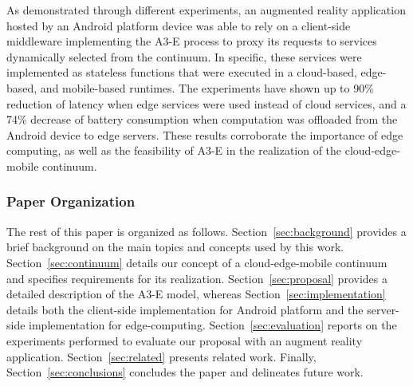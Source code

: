 



As demonstrated through different experiments, an augmented reality application hosted by an Android platform device was able to rely on a client-side middleware implementing the A3-E process to proxy its requests to services dynamically selected from the continuum. In specific, these services were implemented as stateless functions that were executed in a cloud-based, edge-based, and mobile-based runtimes. The experiments have shown up to 90\% reduction of latency when edge services were used instead of cloud services, and a 74\% decrease of battery consumption when computation was offloaded from the Android device to edge servers. These results corroborate the importance of edge computing, as well as the feasibility of A3-E in the realization of the cloud-edge-mobile continuum.




\subsubsection*{Paper Organization}

The rest of this paper is organized as follows. 
Section~\ref{sec:background} provides a brief background on the main topics and concepts used by this work. Section~\ref{sec:continuum} details our concept of a cloud-edge-mobile continuum and specifies requirements for its realization. Section~\ref{sec:proposal} provides a detailed description of the A3-E model, whereas Section~\ref{sec:implementation} details both the client-side implementation for Android platform and the server-side implementation for edge-computing. Section~\ref{sec:evaluation} reports on the experiments performed to evaluate our proposal with an augment reality application. Section~\ref{sec:related} presents related work. Finally, Section~\ref{sec:conclusions} concludes the paper and delineates future work.




